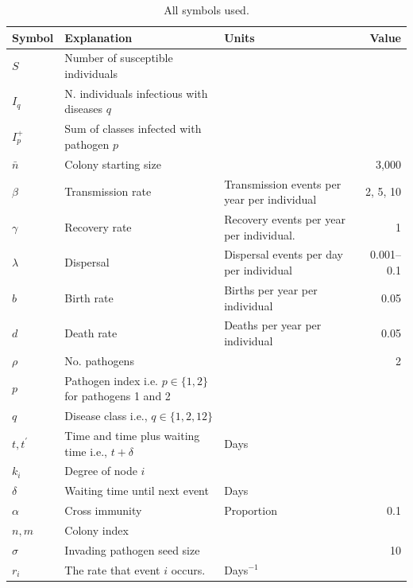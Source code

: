\begin{table}[b!]
\centering
\caption{All symbols used.}
\begin{tabular}{@{}lp{5cm}p{3.9cm}r@{}}
\toprule
Symbol & Explanation & Units & Value\\
\midrule
$S$ & Number of susceptible individuals &&\\
$I_q$ & N. individuals infectious with diseases $q$ &&\\
$I^+_p$ & Sum of classes infected with pathogen $p$ &\\
$\bar{n}$ & Colony starting size && 3,000\\
$\beta$ & Transmission rate & Transmission events per year per individual& 2, 5, 10\\
$\gamma$ & Recovery rate & Recovery events per year per individual. & 1\\
$\lambda$ & Dispersal & Dispersal events per day per individual& 0.001--0.1\\
$b$ & Birth rate & Births per year per individual& 0.05\\
$d$ & Death rate & Deaths per year per individual & 0.05\\
$\rho$ & No. pathogens && 2\\
$p$ &  Pathogen index i.e. $p\in\{1,2\}$ for pathogens 1 and 2 & &\\
$q$ & Disease class i.e., $q\in\{1,2,12\}$&\\
$t, t^\prime$ & Time and time plus waiting time i.e., $t+\delta$ & Days&\\
$k_i$ & Degree of node $i$ &&\\
$\delta$ & Waiting time until next event & Days&\\
$\alpha$ & Cross immunity & Proportion& 0.1\\
$n, m$ & Colony index &&\\
$\sigma$ & Invading pathogen seed size & & 10\\
$r_i$ & The rate that event $i$ occurs. & Days$^{-1}$&\\
\bottomrule
\end{tabular}

\label{t:params}
\end{table}




